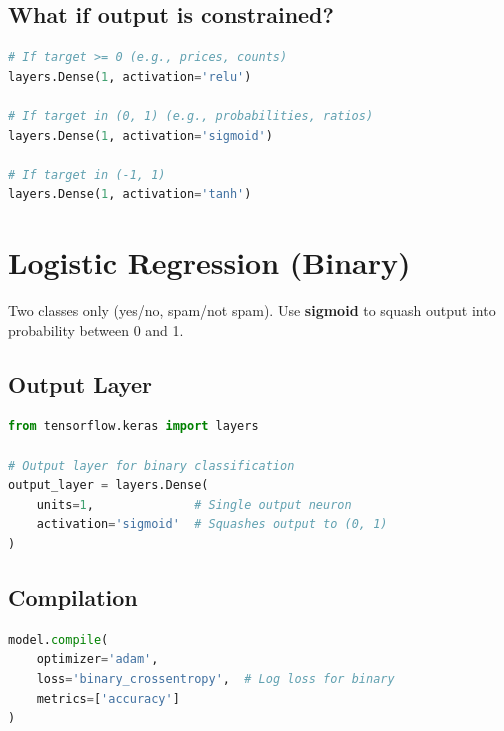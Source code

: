 \documentclass[12pt,a4paper]{article}
\begin{document}
\subsection{What if output is constrained?}

\begin{lstlisting}[language=Python, caption=Constrained Regression Outputs]
# If target >= 0 (e.g., prices, counts)
layers.Dense(1, activation='relu')

# If target in (0, 1) (e.g., probabilities, ratios)
layers.Dense(1, activation='sigmoid')

# If target in (-1, 1)
layers.Dense(1, activation='tanh')
\end{lstlisting}

\newpage


\section{Logistic Regression (Binary)}

Two classes only (yes/no, spam/not spam). Use \textbf{sigmoid} to squash output into probability between 0 and 1.

\subsection{Output Layer}

\begin{lstlisting}[language=Python, caption=Binary Classification Output Layer]
from tensorflow.keras import layers

# Output layer for binary classification
output_layer = layers.Dense(
    units=1,              # Single output neuron
    activation='sigmoid'  # Squashes output to (0, 1)
)
\end{lstlisting}

\subsection{Compilation}

\begin{lstlisting}[language=Python, caption=Compiling for Binary Classification]
model.compile(
    optimizer='adam',
    loss='binary_crossentropy',  # Log loss for binary
    metrics=['accuracy']
)
\end{lstlisting}
\end{document}
